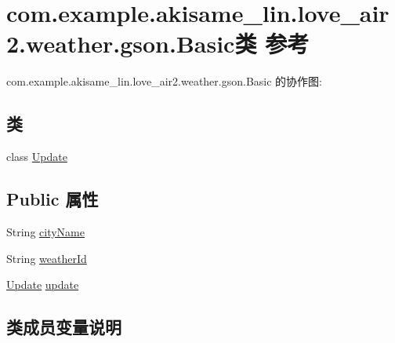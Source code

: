 \hypertarget{classcom_1_1example_1_1akisame__lin_1_1love__air2_1_1weather_1_1gson_1_1_basic}{}\section{com.\+example.\+akisame\+\_\+lin.\+love\+\_\+air2.\+weather.\+gson.\+Basic类 参考}
\label{classcom_1_1example_1_1akisame__lin_1_1love__air2_1_1weather_1_1gson_1_1_basic}


com.\+example.\+akisame\+\_\+lin.\+love\+\_\+air2.\+weather.\+gson.\+Basic 的协作图\+:
\subsection*{类}
\begin{DoxyCompactItemize}
\item 
class \mbox{\hyperlink{classcom_1_1example_1_1akisame__lin_1_1love__air2_1_1weather_1_1gson_1_1_basic_1_1_update}{Update}}
\end{DoxyCompactItemize}
\subsection*{Public 属性}
\begin{DoxyCompactItemize}
\item 
String \mbox{\hyperlink{classcom_1_1example_1_1akisame__lin_1_1love__air2_1_1weather_1_1gson_1_1_basic_a96eb620ddbf1ee31b8020e867391032f}{city\+Name}}
\item 
String \mbox{\hyperlink{classcom_1_1example_1_1akisame__lin_1_1love__air2_1_1weather_1_1gson_1_1_basic_ac306ee656558e3f389793d38638b2367}{weather\+Id}}
\item 
\mbox{\hyperlink{classcom_1_1example_1_1akisame__lin_1_1love__air2_1_1weather_1_1gson_1_1_basic_1_1_update}{Update}} \mbox{\hyperlink{classcom_1_1example_1_1akisame__lin_1_1love__air2_1_1weather_1_1gson_1_1_basic_a16590bb05a7858464faecb91f411b75b}{update}}
\end{DoxyCompactItemize}


\subsection{类成员变量说明}
\mbox{\label{classcom_1_1example_1_1akisame__lin_1_1love__air2_1_1weather_1_1gson_1_1_basic_a96eb620ddbf1ee31b8020e867391032f}} 
